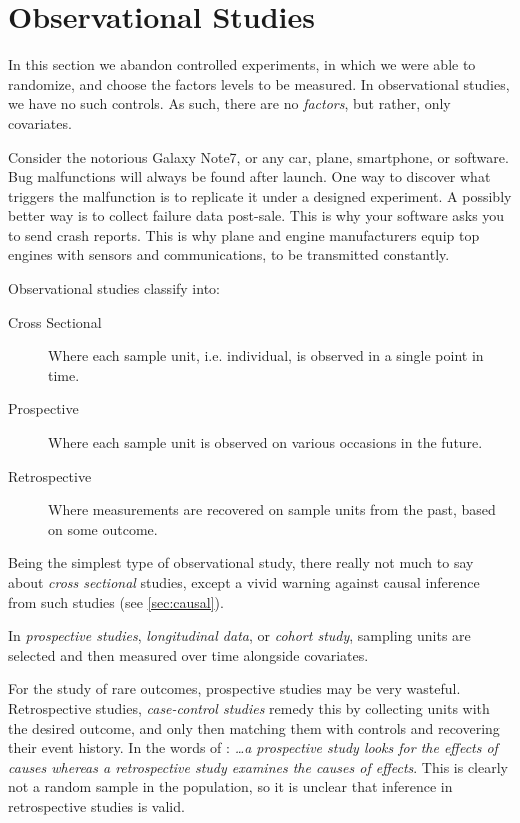 \section{Observational Studies}
\label{sec:observational}

In this section we abandon controlled experiments, in which we were able to randomize, and choose the factors levels to be measured.
In observational studies, we have no such controls. 
As such, there are no \emph{factors}, but rather, only covariates. 


\begin{example}
	\label{ex:post-sale}
	Consider the notorious Galaxy Note7, or any car, plane, smartphone, or software. 
	Bug malfunctions will always be found after launch.
	One way to discover what triggers the malfunction is to replicate it under a designed experiment. 
	A possibly better way is to collect failure data post-sale.
	This is why your software asks you to send crash reports. 
	This is why plane and engine manufacturers equip top engines with sensors and communications, to be transmitted constantly. 	
\end{example}


Observational studies classify into:
\begin{description}
	\item[Cross Sectional] Where each sample unit, i.e. individual, is observed in a single point in time. 
	\item[Prospective] Where each sample unit is observed on various occasions in the future. 
	\item[Retrospective] Where measurements are recovered on sample units from the past, based on some outcome. 
\end{description}


Being the simplest type of observational study, there really not much to say about \emph{cross sectional} studies, except a vivid warning against causal inference from such studies (see \ref{sec:causal}).

In \emph{prospective studies}, \aka \emph{longitudinal data}, or \emph{cohort study}, sampling units are selected and then measured over time alongside covariates. 

For the study of rare outcomes, prospective studies may be very wasteful. 
Retrospective studies, \aka \emph{case-control studies} remedy this by collecting units with the desired outcome, and only then matching them with controls and recovering their event history. In the words of \cite{cox_principles_2011}: {\em \dots a prospective study looks for the effects of causes whereas a retrospective study examines the causes of effects}.
This is clearly not a random sample in the population, so it is unclear that inference in retrospective studies is valid. 

